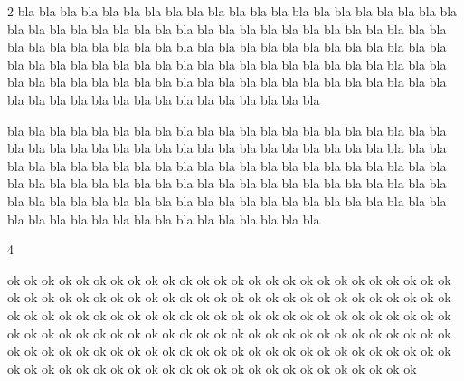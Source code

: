\documentclass[]{article}
\newlength{\mycolumnsep}
\newlength{\mycolumnseprule}
\newlength{\mysubcolumnsep}
\newlength{\mysubcolumnseprule}
\newenvironment{submulticols}[1]{%
        \setlength{\columnsep}{\mysubcolumnsep}
        \setlength{\columnseprule}{\mysubcolumnseprule}
        \begin{multicols}{#1}
    }{%
        \end{multicols}
    }
\begin{document}
\begin{multicols}{2}
    bla bla bla bla bla bla bla bla bla bla bla bla bla bla bla
    bla bla bla bla bla bla bla bla bla bla bla bla bla bla bla
    bla bla bla bla bla bla bla bla bla bla bla bla bla bla bla
    bla bla bla bla bla bla bla bla bla bla bla bla bla bla bla
    bla bla bla bla bla bla bla bla bla bla bla bla bla bla bla
    bla bla bla bla bla bla bla bla bla bla bla bla bla bla bla
    bla bla bla bla bla bla bla bla bla bla bla bla bla bla bla
    bla bla bla bla bla bla bla bla bla bla bla bla bla bla bla

    bla bla bla bla bla bla bla bla bla bla bla bla bla bla bla
    bla bla bla bla bla bla bla bla bla bla bla bla bla bla bla
    bla bla bla bla bla bla bla bla bla bla bla bla bla bla bla
    bla bla bla bla bla bla bla bla bla bla bla bla bla bla bla
    bla bla bla bla bla bla bla bla bla bla bla bla bla bla bla
    bla bla bla bla bla bla bla bla bla bla bla bla bla bla bla
    bla bla bla bla bla bla bla bla bla bla bla bla bla bla bla
    bla bla bla bla bla bla bla bla bla bla bla bla bla bla bla


    \begin{submulticols}{4}
        ok ok ok ok ok ok ok ok ok ok ok ok ok ok
        ok ok ok ok ok ok ok ok ok ok ok ok ok ok
        ok ok ok ok ok ok ok ok ok ok ok ok ok ok
        ok ok ok ok ok ok ok ok ok ok ok ok ok ok
        ok ok ok ok ok ok ok ok ok ok ok ok ok ok
        ok ok ok ok ok ok ok ok ok ok ok ok ok ok
        ok ok ok ok ok ok ok ok ok ok ok ok ok ok
        ok ok ok ok ok ok ok ok ok ok ok ok ok ok
        ok ok ok ok ok ok ok ok ok ok ok ok ok ok
        ok ok ok ok ok ok ok ok ok ok ok ok ok ok
        ok ok ok ok ok ok ok ok ok ok ok ok ok ok 
    \end{submulticols}
\end{multicols}
\end{document}
